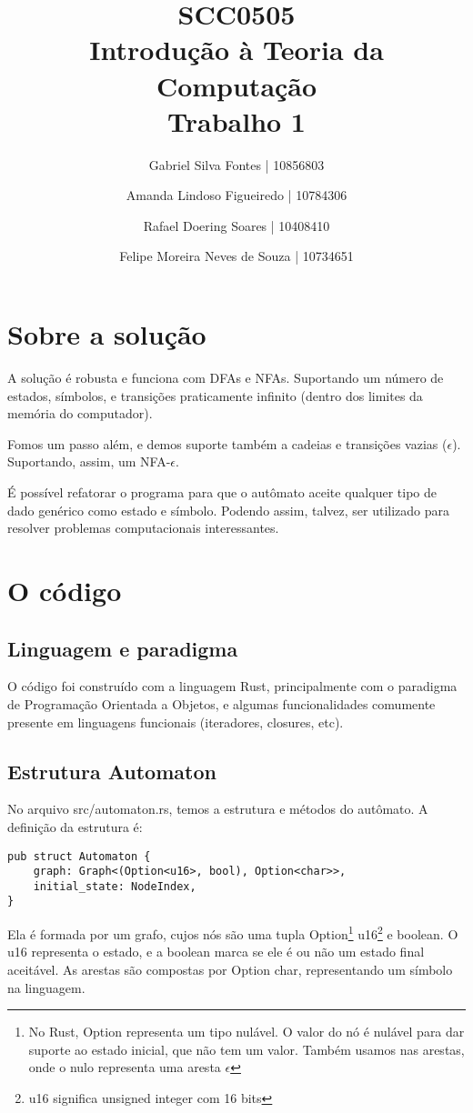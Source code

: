 \documentclass[12pt]{article}
\title{SCC0505 \\ Introdução à Teoria da Computação \\ Trabalho 1}
\author{Gabriel Silva Fontes | 10856803
        \and
        Amanda Lindoso Figueiredo | 10784306
        \and
        Rafael Doering Soares | 10408410
        \and
        Felipe Moreira Neves de Souza | 10734651}
\begin{document}
\maketitle
\section{Sobre a solução}
A solução é robusta e funciona com DFAs e NFAs. Suportando um número de estados, símbolos, e transições praticamente infinito (dentro dos limites da memória do computador).

Fomos um passo além, e demos suporte também a cadeias e transições vazias (\(\epsilon\)). Suportando, assim, um NFA-\(\epsilon\).

É possível refatorar o programa para que o autômato aceite qualquer tipo de dado genérico como estado e símbolo. Podendo assim, talvez, ser utilizado para resolver problemas computacionais interessantes.

\section{O código}
\subsection{Linguagem e paradigma}
O código foi construído com a linguagem Rust, principalmente com o paradigma de Programação Orientada a Objetos, e algumas funcionalidades comumente presente em linguagens funcionais (iteradores, closures, etc).

\subsection{Estrutura Automaton}
No arquivo src/automaton.rs, temos a estrutura e métodos do autômato.
A definição da estrutura é:

\begin{verbatim}
pub struct Automaton {
    graph: Graph<(Option<u16>, bool), Option<char>>,
    initial_state: NodeIndex,
}
\end{verbatim}

Ela é formada por um grafo, cujos nós são uma tupla Option\footnote{No Rust, Option representa um tipo nulável. O valor do nó é nulável para dar suporte ao estado inicial, que não tem um valor. Também usamos nas arestas, onde o nulo representa uma aresta \(\epsilon\)} u16\footnote{u16 significa unsigned integer com 16 bits} e boolean. O u16 representa o estado, e a boolean marca se ele é ou não um estado final aceitável. As arestas são compostas por Option char, representando um símbolo na linguagem.
\end{document}
